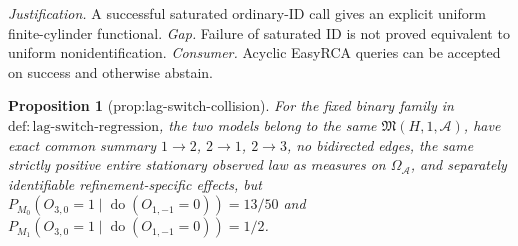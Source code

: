 \documentclass{article}
\newtheorem{proposition}{Proposition}
\begin{document}
\par\smallskip\noindent \textit{Justification.} A successful saturated ordinary-ID call gives an explicit uniform finite-cylinder functional. \textit{Gap.} Failure of saturated ID is not proved equivalent to uniform nonidentification. \textit{Consumer.} Acyclic EasyRCA queries can be accepted on success and otherwise abstain.

\begin{proposition}[prop:lag-switch-collision]\label{prop:lag-switch-collision}
For the fixed binary family in \(\mathrm{def:lag\text{-}switch\text{-}regression}\), the two models belong to the same \(\mathfrak M(H,1,\mathcal A)\), have exact common summary \(1\to2\), \(2\to1\), \(2\to3\), no bidirected edges, the same strictly positive entire stationary observed law as measures on \(\Omega_{\mathcal A}\), and separately identifiable refinement-specific effects, but \(P_{M_0}(O_{3,0}=1\mid\operatorname{do}(O_{1,-1}=0))=13/50\) and \(P_{M_1}(O_{3,0}=1\mid\operatorname{do}(O_{1,-1}=0))=1/2\).
\end{proposition}
\end{document}
